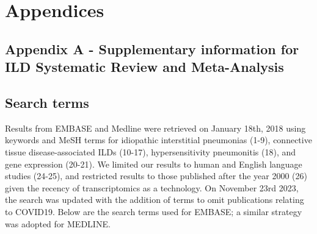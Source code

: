 \documentclass[
]{article}
\begin{document}
\section*{Appendices}

\setcounter{secnumdepth}{0}

\hypertarget{appendix-a---supplementary-information-for-ild-systematic-review-and-meta-analysis}{%
\subsection{Appendix A - Supplementary information for ILD Systematic Review and Meta-Analysis}\label{appendix-a---supplementary-information-for-ild-systematic-review-and-meta-analysis}}

\renewcommand{\thefigure}{A2.\arabic{figure}}
\setcounter{figure}{0}
\renewcommand{\thetable}{A2.\arabic{table}}
\setcounter{table}{0}
\renewcommand{\theequation}{A2.\arabic{equation}}
\setcounter{equation}{0}

\hypertarget{search-terms}{%
\subsection{Search terms}\label{search-terms}}

Results from EMBASE and Medline were retrieved on January 18th, 2018 using keywords and MeSH terms for idiopathic interstitial pneumonias (1-9), connective tissue disease-associated ILDs (10-17), hypersensitivity pneumonitis (18), and gene expression (20-21). We limited our results to human and English language studies (24-25), and restricted results to those published after the year 2000 (26) given the recency of transcriptomics as a technology. On November 23rd 2023, the search was updated with the addition of terms to omit publications relating to COVID19. Below are the search terms used for EMBASE; a similar strategy was adopted for MEDLINE.
\end{document}
